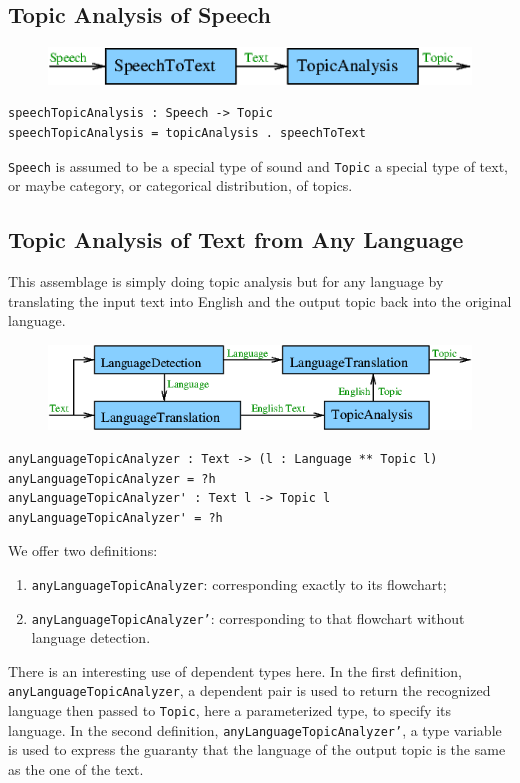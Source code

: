 \documentclass[]{article}
\begin{document}
\subsection{Topic Analysis of Speech}
\begin{figure}[H]
  \centering
  \includegraphics[scale=0.55]{figs/SpeechTopicAnalysis.png}
\end{figure}
\begin{verbatim}
speechTopicAnalysis : Speech -> Topic
speechTopicAnalysis = topicAnalysis . speechToText
\end{verbatim}
\texttt{Speech} is assumed to be a special type of sound and
\texttt{Topic} a special type of text, or maybe category, or
categorical distribution, of topics.

\subsection{Topic Analysis of Text from Any Language}
This assemblage is simply doing topic analysis but for any language by
translating the input text into English and the output topic back into
the original language.
\begin{figure}[H]
  \centering
  \includegraphics[scale=0.55]{figs/AnyLanguageTopicAnalysis.png}
\end{figure}
\begin{verbatim}
anyLanguageTopicAnalyzer : Text -> (l : Language ** Topic l)
anyLanguageTopicAnalyzer = ?h
anyLanguageTopicAnalyzer' : Text l -> Topic l
anyLanguageTopicAnalyzer' = ?h
\end{verbatim}
We offer two definitions:
\begin{enumerate}
\item \texttt{anyLanguageTopicAnalyzer}: corresponding exactly to its
  flowchart;
\item \texttt{anyLanguageTopicAnalyzer'}: corresponding to that
  flowchart without language detection.
\end{enumerate}
There is an interesting use of dependent types here.  In the first
definition, \texttt{anyLanguageTopicAnalyzer}, a dependent pair is
used to return the recognized language then passed to \texttt{Topic},
here a parameterized type, to specify its language.  In the second
definition, \texttt{anyLanguageTopicAnalyzer'}, a type variable is
used to express the guaranty that the language of the output topic is
the same as the one of the text.
\end{document}
